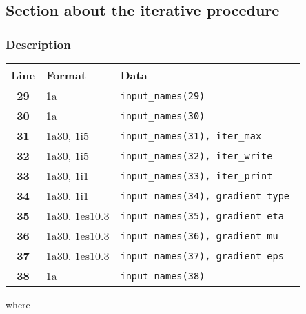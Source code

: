 \documentclass[a4paper,11pt]{article}
\begin{document}
%
%
\subsection{Section about the iterative procedure}

\subsubsection*{Description}
\begin{center}
\begin{tabular}{|c|l|l|}
\hline
Line & Format & Data \\
\hline
 \textbf{29}   & 1a            & \tt input\_names(29)                 \\
 \textbf{30}   & 1a            & \tt input\_names(30)                 \\
 \textbf{31}   & 1a30, 1i5     & \tt input\_names(31), iter\_max      \\
 \textbf{32}   & 1a30, 1i5     & \tt input\_names(32), iter\_write    \\
 \textbf{33}   & 1a30, 1i1     & \tt input\_names(33), iter\_print    \\
 \textbf{34}   & 1a30, 1i1     & \tt input\_names(34), gradient\_type \\
 \textbf{35}   & 1a30, 1es10.3 & \tt input\_names(35), gradient\_eta  \\
 \textbf{36}   & 1a30, 1es10.3 & \tt input\_names(36), gradient\_mu   \\
 \textbf{37}   & 1a30, 1es10.3 & \tt input\_names(37), gradient\_eps  \\
 \textbf{38}   & 1a            & \tt input\_names(38)                 \\
\hline
\end{tabular}
\end{center}
where 
\end{document}
